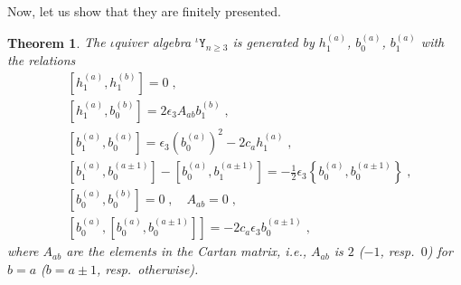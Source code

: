 \documentclass[11pt]{article}
\numberwithin{equation}{section}
\numberwithin{figure}{section}
\numberwithin{table}{section}
\newtheorem{theorem}{Theorem}[section]
\begin{document}
Now, let us show that they are finitely presented.
\begin{theorem}
	The $\iota$quiver algebra ${}^\iota\mathtt{Y}_{n\geq3}$ is generated by $h^{(a)}_1$, $b^{(a)}_0$, $b^{(a)}_1$ with the relations
	\begin{subequations}
		\begin{align}
			&\left[h^{(a)}_1,h^{(b)}_1\right]=0\;,\\
			&\left[h^{(a)}_1,b^{(b)}_0\right]=2\epsilon_3A_{ab}b^{(b)}_1\;,\\
			&\left[b^{(a)}_1,b^{(a)}_0\right]=\epsilon_3\left(b^{(a)}_0\right)^2-2c_ah^{(a)}_1\;,\\
			&\left[b^{(a)}_1,b^{(a\pm1)}_0\right]-\left[b^{(a)}_0,b^{(a\pm1)}_1\right]=-\frac{1}{2}\epsilon_3\left\{b^{(a)}_0,b^{(a\pm1)}_0\right\}\;,\\
			&\left[b^{(a)}_0,b^{(b)}_0\right]=0\;,\quad A_{ab}=0\;,\\
			&\left[b^{(a)}_0,\left[b^{(a)}_0,b^{(a\pm1)}_0\right]\right]=-2c_a\epsilon_3b^{(a\pm1)}_0\;,
		\end{align}
	\end{subequations}
	where $A_{ab}$ are the elements in the Cartan matrix, i.e., $A_{ab}$ is $2$ ($-1$, resp.~$0$) for $b=a$ ($b=a\pm1$, resp.~otherwise).
\end{theorem}
\end{document}
